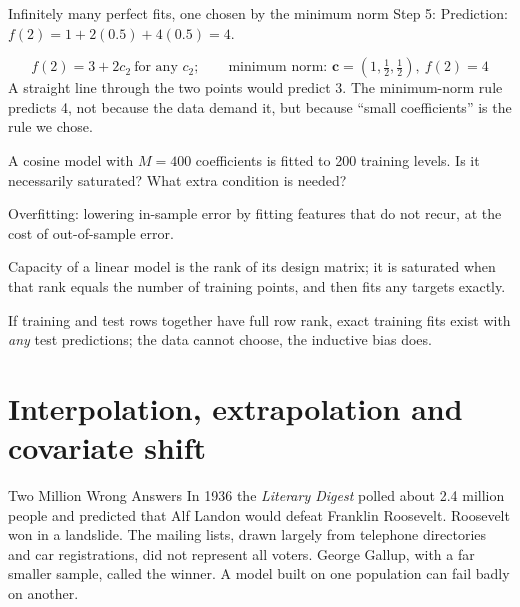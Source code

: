 \begin{sample}{Infinitely many perfect fits, one chosen by the minimum norm}
Step 5: Prediction: $f(2)=1+2(0.5)+4(0.5)=4$.

\[
\boxed{f(2)=3+2c_2\ \text{for any }c_2;\qquad\text{minimum norm: }\bm c=(1,\tfrac12,\tfrac12),\ f(2)=4}
\]
A straight line through the two points would predict 3. The minimum-norm rule predicts 4, not because the data demand it, but because ``small coefficients'' is the rule we chose.
\end{sample}

\begin{checkpoint}
A cosine model with $M=400$ coefficients is fitted to 200 training levels. Is it necessarily saturated? What extra condition is needed?
\end{checkpoint}

\begin{keyideas}
\item Overfitting: lowering in-sample error by fitting features that do not recur, at the cost of out-of-sample error.
\item Capacity of a linear model is the rank of its design matrix; it is saturated when that rank equals the number of training points, and then fits any targets exactly.
\item If training and test rows together have full row rank, exact training fits exist with \emph{any} test predictions; the data cannot choose, the inductive bias does.
\end{keyideas}

\section{Interpolation, extrapolation and covariate shift}\label{sec:generalization-shift}
\begin{didyouknow}{Two Million Wrong Answers}
In 1936 the \emph{Literary Digest} polled about 2.4 million people and predicted that Alf Landon would defeat Franklin Roosevelt. Roosevelt won in a landslide. The mailing lists, drawn largely from telephone directories and car registrations, did not represent all voters. George Gallup, with a far smaller sample, called the winner. A model built on one population can fail badly on another.
\end{didyouknow}

